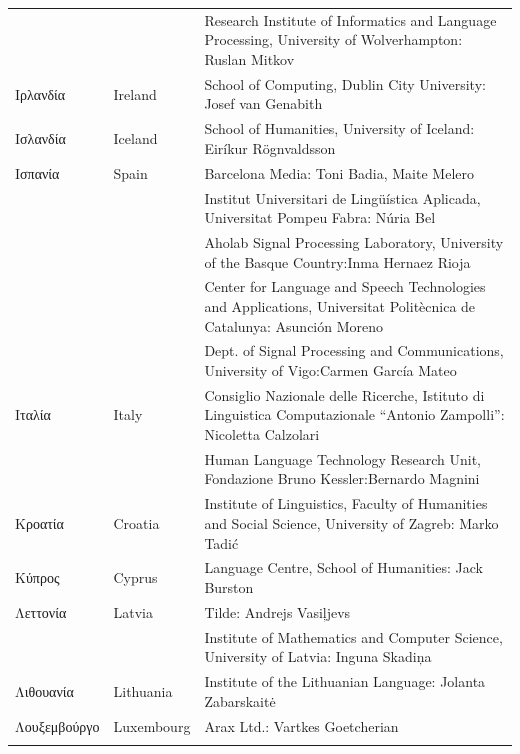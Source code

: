 \begin{longtable}{@{}llp{113mm}@{}}
  & & Research Institute of Informatics and Language Processing, University of Wolverhampton: Ruslan Mitkov \\ \addlinespace 
  Ιρλανδία & \textcolor{grey1}{Ireland} & School of Computing, Dublin City University: Josef van Genabith\\ \addlinespace
  Ισλανδία & \textcolor{grey1}{Iceland} & School of Humanities, University of Iceland: Eiríkur Rögnvaldsson\\ \addlinespace
  Ισπανία & \textcolor{grey1}{Spain} & Barcelona Media: Toni Badia, Maite Melero \\ \addlinespace 
  & & Institut Universitari de Lingüística Aplicada, Universitat Pompeu Fabra: Núria Bel \\ \addlinespace 
  & & Aholab Signal Processing Laboratory, University of the Basque Country:\newline Inma Hernaez Rioja \\ \addlinespace 
  & & Center for Language and Speech Technologies and Applications, Universitat Politècnica de Catalunya:  Asunción Moreno \\ \addlinespace 
  & & Dept. of Signal Processing and Communications, University of Vigo:\newline Carmen García Mateo \\ \addlinespace 
  Ιταλία & \textcolor{grey1}{Italy} & Consiglio Nazionale delle Ricerche, Istituto di Linguistica Computazionale “Antonio Zampolli”: Nicoletta Calzolari\\ \addlinespace
  & & Human Language Technology Research Unit, Fondazione Bruno Kessler:\newline Bernardo Magnini\\ \addlinespace 
  Κροατία & \textcolor{grey1}{Croatia} & Institute of Linguistics, Faculty of Humanities and Social Science, University of Zagreb: Marko Tadić \\ \addlinespace
  Κύπρος & \textcolor{grey1}{Cyprus} & Language Centre, School of Humanities: Jack Burston\\ \addlinespace
  Λεττονία & \textcolor{grey1}{Latvia} & Tilde: Andrejs Vasiļjevs\\ \addlinespace 
  & & Institute of Mathematics and Computer Science, University of Latvia: Inguna Skadiņa\\ \addlinespace
  Λιθουανία & \textcolor{grey1}{Lithuania} & Institute of the Lithuanian Language: Jolanta Zabarskaitė\\ \addlinespace
  Λουξεμβούργο & \textcolor{grey1}{Luxembourg} & Arax Ltd.: Vartkes Goetcherian\\ \addlinespace

\end{longtable}
